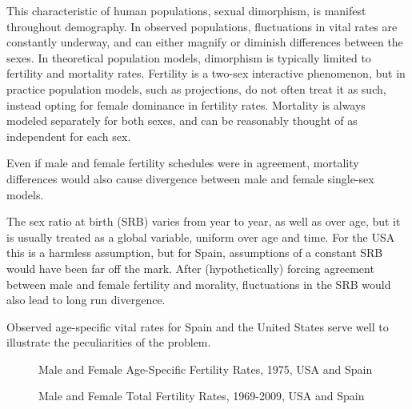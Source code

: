
This characteristic of human populations, sexual dimorphism,
is manifest throughout demography. In observed populations,
fluctuations in vital rates are constantly underway, and can either magnify or
diminish differences between the sexes. In theoretical population models,
dimorphism is typically limited to fertility and mortality rates. Fertility 
is a two-sex interactive phenomenon, but in practice 
population models, such as projections, do not often treat it as
such, instead opting for female dominance in fertility rates. Mortality is
always modeled separately for both sexes, and can be reasonably thought of 
as independent for each sex. 

Even if male and female
fertility schedules were in agreement, mortality differences would also
cause divergence between male and female single-sex models. 

The sex ratio at
birth (SRB) varies from year to year, as well as over age, but it is usually
treated as a global variable, uniform over age and time. For the USA this is 
a harmless assumption, but for Spain, 
assumptions of a constant SRB would have been far off the mark. After
(hypothetically) forcing agreement between male and female fertility and
morality, fluctuations in the SRB would also lead to long run divergence.



Observed age-specific vital rates for Spain and the United States serve 
well to illustrate the peculiarities of the problem.  %

\begin{figure}[ht!]
        \centering  
          \caption{Male and Female Age-Specific Fertility Rates, 1975, USA and
          Spain}
          \label{fig:ASFR1975}
\end{figure}


\begin{figure}[ht!]
        \centering  
          \caption{Male and Female Total Fertility Rates, 1969-2009, USA and
          Spain}
          \label{fig:TFRseries}
\end{figure}

